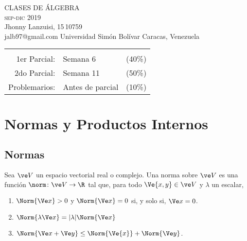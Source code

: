 


\frontmatter

\begin{titlepage}
	\centering
	{\huge{} CLASES DE ÁLGEBRA }\\[1em]
	{\Large{\scshape sep-dic} 2019}\\
	\vfill
	{\large Jhonny Lanzuisi, 15\,10759}\\[.7em]
	{\large\ttfamily jalb97@gmail.com}
	\vfill
	Universidad Simón Bolívar \hfill Caracas, Venezuela
\end{titlepage}

\begin{flushleft}
	\begin{tabular}[c]{rlr} 
		\addlinespace[.5em]
		\multicolumn{3}{l}{\LARGE Evaluaciones} \\[1em]
		{ 1}er Parcial: & Semana 6 &({40}\%) \\
		{ 2}do Parcial: & Semana 11 &({50}\%) \\
		 Problemarios: & Antes de parcial &({10}\%) \\
	\end{tabular}
\end{flushleft}
\mainmatter

\chapter[normas y productos internos]{Normas y Productos Internos}

\section{Normas}
\noindent
\begin{defi}[norma]
	Sea $\ve V$ un espacio vectorial real o complejo. Una norma sobre $\ve V$ es una función $\norm\colon\ve V\to\R$ tal que, para todo $\Ve{x, y}\in\ve V$ y $\lambda$ un escalar,
	\begin{enumerate}
		\item $\Norm{\Ve x}>0$ y $\Norm{\Ve x} = 0$ si, y solo si, $\Ve x = 0$.
		\item $\Norm{\lambda\Ve x} = |\lambda|\Norm{\Ve x}$
		\item $\Norm{\Ve x+\Ve y} \leq \Norm{\Ve{x}} + \Norm{\Ve y}$.
	\end{enumerate}
\end{defi}

